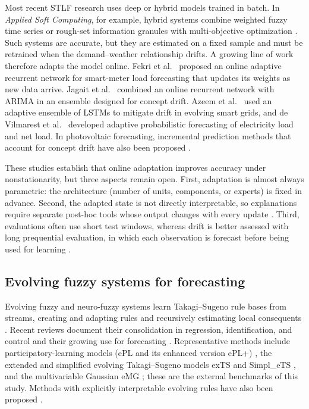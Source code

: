 \documentclass[preprint,12pt]{elsarticle}
\begin{document}
Most recent STLF research uses deep or hybrid models trained in batch. In \emph{Applied Soft Computing}, for example, hybrid systems combine weighted fuzzy time series or rough-set information granules with multi-objective optimization \citep{cao2023hybrid,wang2023rough}. Such systems are accurate, but they are estimated on a fixed sample and must be retrained when the demand--weather relationship drifts. A growing line of work therefore adapts the model online. Fekri et al.\ \citep{fekri2021online} proposed an online adaptive recurrent network for smart-meter load forecasting that updates its weights as new data arrive. Jagait et al.\ \citep{jagait2021load} combined an online recurrent network with ARIMA in an ensemble designed for concept drift. Azeem et al.\ \citep{azeem2025mitigating} used an adaptive ensemble of LSTMs to mitigate drift in evolving smart grids, and de Vilmarest et al.\ \citep{devilmarest2024adaptive} developed adaptive probabilistic forecasting of electricity load and net load. In photovoltaic forecasting, incremental prediction methods that account for concept drift have also been proposed \citep{zhang2023incremental}.

These studies establish that online adaptation improves accuracy under nonstationarity, but three aspects remain open. First, adaptation is almost always parametric: the architecture (number of units, components, or experts) is fixed in advance. Second, the adapted state is not directly interpretable, so explanations require separate post-hoc tools whose output changes with every update \citep{friedman2008rulefit,rudin2019interpretable}. Third, evaluations often use short test windows, whereas drift is better assessed with long prequential evaluation, in which each observation is forecast before being used for learning \citep{gama2013evaluating,cerqueira2020evaluating}.

\subsection{Evolving fuzzy systems for forecasting}
\label{sec:related_neuro_fuzzy_evolving}

Evolving fuzzy and neuro-fuzzy systems learn Takagi--Sugeno rule bases \citep{takagi1985fuzzy} from streams, creating and adapting rules and recursively estimating local consequents \citep{angelov2004approach,skrjanc2019survey}. Recent reviews document their consolidation in regression, identification, and control \citep{decampossouza2020review,andonovski2026advancements} and their growing use for forecasting \citep{vanegas2024systematic}. Representative methods include participatory-learning models (ePL and its enhanced version ePL+) \citep{lima2010epl,maciel2014eplplus}, the extended and simplified evolving Takagi--Sugeno models exTS and Simpl\_eTS \citep{angelov2006exts,angelov2005simplets}, and the multivariable Gaussian eMG \citep{lemos2011emg}; these are the external benchmarks of this study. Methods with explicitly interpretable evolving rules have also been proposed \citep{DECAMPOSSOUZA2021231}.
\end{document}
